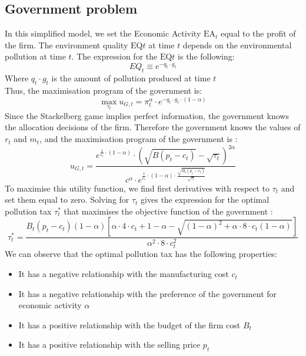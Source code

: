 \documentclass{article}
\begin{document}
\subsection{Government problem}
In this simplified model, we set the Economic Activity $\text{EA}_{t}$ equal to the profit of the firm.
The environment quality $\text{EQ}{t}$ at time $t$ depends on the environmental pollution at time $t$. The expression for the $\text{EQ}{t}$ is the following: 
\begin{equation}
    EQ_{t}\equiv e^{-q_{t}\cdot g_{t}}
\end{equation}
Where $q_{t}\cdot g_{t}$ is the amount of pollution produced at time $t$ \\
Thus, the maximisation program of the government is: 
\begin{equation*}
    \max_{\tau_{t}}{u_{G,t}=\pi_{t}^{\alpha}\cdot e^{-q_{t}\cdot g_{t}\cdot(1-\alpha)}}
\end{equation*}
Since the Stackelberg game implies perfect information, the government knows the allocation decisions of the firm. Therefore  the government knows the values of $r_{t}$ and $m_{t}$, and the maximisation program of the government is \footnotemark[6]: 
\begin{equation}
    u_{G,t}=\frac{e^{\frac{1}{c_{t}}\cdot\left(1-\alpha\right)}\cdot\left(\sqrt{B(p_{t}-c_{t})}-\sqrt{\tau_{t}}\right)^{2\alpha}}{c^{\alpha}\cdot e^{\frac{1}{c_{t}}\cdot(1-\alpha)\cdot\frac{\sqrt{B_{t}(p_{t}-c_{t})}}{\sqrt{\tau_{t}}}}}
\end{equation}
To maximise this utility function, we find first derivatives with respect to $\tau_{t}$ and set them equal to zero. Solving for $\tau_{t}$ gives the expression for the optimal pollution tax $\tau_{t}^{*}$ that maximises the objective function of the government \footnotemark[7] : 
\begin{equation}
    \tau_{t}^{*}=\frac{B_{t}\left(p_{t}-c_{t}\right)(1-\alpha)\left[{\alpha \cdot 4\cdot c_{t}+1-\alpha}-\sqrt{(1-\alpha)^{2}+\alpha\cdot8\cdot c_{t}(1-\alpha)}\right]} {\alpha^{2} \cdot 8\cdot c_{t}^{2}}
\end{equation}
We can observe that the optimal pollution tax has the following properties: 
\begin{itemize}
    \item It has a negative relationship with the manufacturing cost $c_{t}$
    \item It has a negative relationship with the preference of the government for economic activity $\alpha$
    \item It has a positive relationship with the budget of the firm cost $B_{t}$
    \item It has a positive relationship with the selling price $p_{t}$
\end{itemize}
\end{document}
